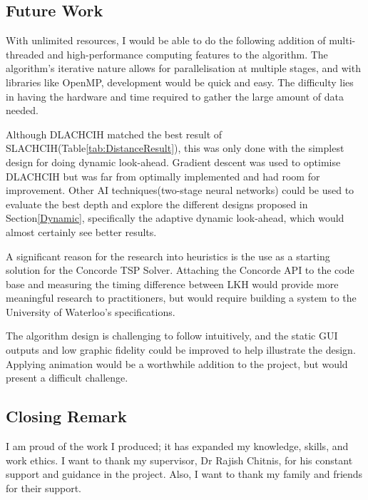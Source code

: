 \subsection{Future Work}

With unlimited resources, I would be able to do the following addition of multi-threaded and high-performance computing features to the algorithm. The algorithm's iterative nature allows for parallelisation at multiple stages, and with libraries like OpenMP\cite{openmp2023}, development would be quick and easy. The difficulty lies in having the hardware and time required to gather the large amount of data needed.

Although DLACHCIH matched the best result of SLACHCIH(Table\ref{tab:DistanceResult}), this was only done with the simplest design for doing dynamic look-ahead. Gradient descent was used to optimise DLACHCIH but was far from optimally implemented and had room for improvement. Other AI techniques(two-stage neural networks) could be used to evaluate the best depth and explore the different designs proposed in Section\ref{Dynamic}, specifically the adaptive dynamic look-ahead, which would almost certainly see better results.

A significant reason for the research into heuristics is the use as a starting solution for the Concorde TSP Solver. Attaching the Concorde API to the code base and measuring the timing difference between LKH would provide more meaningful research to practitioners, but would require building a system to the University of Waterloo's specifications.

The algorithm design is challenging to follow intuitively, and the static GUI outputs and low graphic fidelity could be improved to help illustrate the design. Applying animation would be a worthwhile addition to the project, but would present a difficult challenge.

\subsection{Closing Remark}

I am proud of the work I produced; it has expanded my knowledge, skills, and work ethics. I want to thank my supervisor, Dr Rajish Chitnis, for his constant support and guidance in the project. Also, I want to thank my family and friends for their support. 